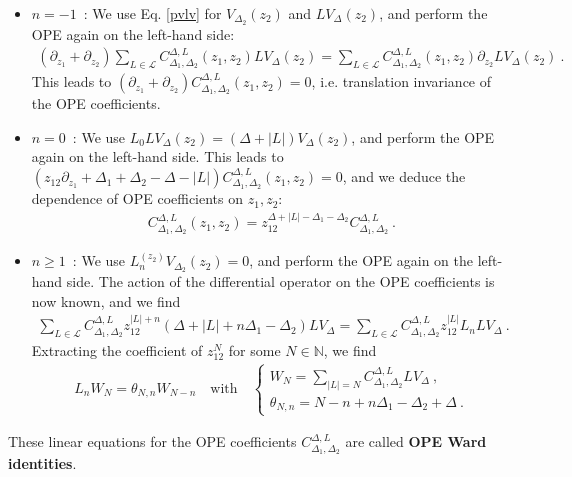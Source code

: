 \documentclass[12pt, a4paper]{article}
\newcommand{\myindex}[1]{\textbf{\boldmath #1}}
\begin{document}
\begin{itemize}
 \item $\boxed{n=-1}$\ : We use Eq. \eqref{pvlv} for $V_{\Delta_2}(z_2)$ and $LV_{\Delta}(z_2)$, and perform the OPE again on the left-hand side:
 \begin{align}
 \left(\partial_{z_1}+\partial_{z_2}\right) \sum_{L\in \mathcal{L}} C_{\Delta_1,\Delta_2}^{\Delta, L}(z_1,z_2)LV_\Delta(z_2) = \sum_{L\in \mathcal{L}} C_{\Delta_1,\Delta_2}^{\Delta, L}(z_1,z_2)\partial_{z_2} LV_\Delta(z_2) \ .
 \end{align}
 This leads to $(\partial_{z_1}+\partial_{z_2})C^{\Delta,L}_{\Delta_1,\Delta_2}(z_1,z_2)=0$, i.e. translation invariance of the OPE coefficients.
 \item $\boxed{n=0}$\ : We use $L_0LV_{\Delta}(z_2)= (\Delta+|L|) V_{\Delta}(z_2)$, and perform the OPE again on the left-hand side. This leads to $(z_{12}\partial_{z_1}+\Delta_1+\Delta_2-\Delta-|L|)C^{\Delta,L}_{\Delta_1,\Delta_2}(z_1,z_2) = 0$, and we deduce the dependence of OPE coefficients on $z_1,z_2$:
 \begin{align}
  C^{\Delta,L}_{\Delta_1,\Delta_2}(z_1,z_2) = z_{12}^{\Delta+|L|-\Delta_1-\Delta_2} C^{\Delta,L}_{\Delta_1,\Delta_2}\ . 
 \end{align}
\item $\boxed{n\geq 1}$\ : We use $L_n^{(z_2)}V_{\Delta_2}(z_2)=0$, and perform the OPE again on the left-hand side. The action of the differential operator on the OPE coefficients is now known, and we find 
\begin{align}
 \sum_{L\in\mathcal{L}} C^{\Delta,L}_{\Delta_1,\Delta_2}z_{12}^{|L|+n}(\Delta+|L|+n\Delta_1-\Delta_2) LV_{\Delta}= \sum_{L\in\mathcal{L}} C^{\Delta,L}_{\Delta_1,\Delta_2}z_{12}^{|L|}L_n LV_{\Delta}\ .
\end{align}
Extracting the coefficient of $z_{12}^N$ for some $N\in\mathbb{N}$, we find 
\begin{align}
 L_n W_N = \theta_{N,n}W_{N-n} \quad \text{with} \quad \left\{\begin{array}{l} W_N = \sum_{|L|=N}C^{\Delta,L}_{\Delta_1,\Delta_2} LV_{\Delta}\ , \\  \theta_{N,n} = N-n+n\Delta_1-\Delta_2 + \Delta\ . \end{array}\right.
 \label{opew}
\end{align}
\end{itemize}
These linear equations for the OPE coefficients $C^{\Delta,L}_{\Delta_1,\Delta_2}$ are called \myindex{OPE Ward identities}. 
\end{document}
